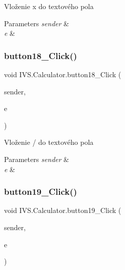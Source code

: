 Vloženie \textquotesingle{}x\textquotesingle{} do textového pola 


\begin{DoxyParams}{Parameters}
{\em sender} & \\
\hline
{\em e} & \\
\hline
\end{DoxyParams}
\mbox{\label{class_i_v_s_1_1_calculator_ac17b0f46c51a9168ee13eb7ec43bf882}} 
\subsubsection{\texorpdfstring{button18\+\_\+\+Click()}{button18\_Click()}}
{\footnotesize\ttfamily void I\+V\+S.\+Calculator.\+button18\+\_\+\+Click (\begin{DoxyParamCaption}\item[{object}]{sender,  }\item[{Event\+Args}]{e }\end{DoxyParamCaption})\hspace{0.3cm}{\ttfamily [protected]}}



Vloženie \textquotesingle{}/\textquotesingle{} do textového pola 


\begin{DoxyParams}{Parameters}
{\em sender} & \\
\hline
{\em e} & \\
\hline
\end{DoxyParams}
\mbox{\label{class_i_v_s_1_1_calculator_a2ec5538328f39267ddd848fbc9200de7}} 
\subsubsection{\texorpdfstring{button19\+\_\+\+Click()}{button19\_Click()}}
{\footnotesize\ttfamily void I\+V\+S.\+Calculator.\+button19\+\_\+\+Click (\begin{DoxyParamCaption}\item[{object}]{sender,  }\item[{Event\+Args}]{e }\end{DoxyParamCaption})\hspace{0.3cm}{\ttfamily [protected]}}



